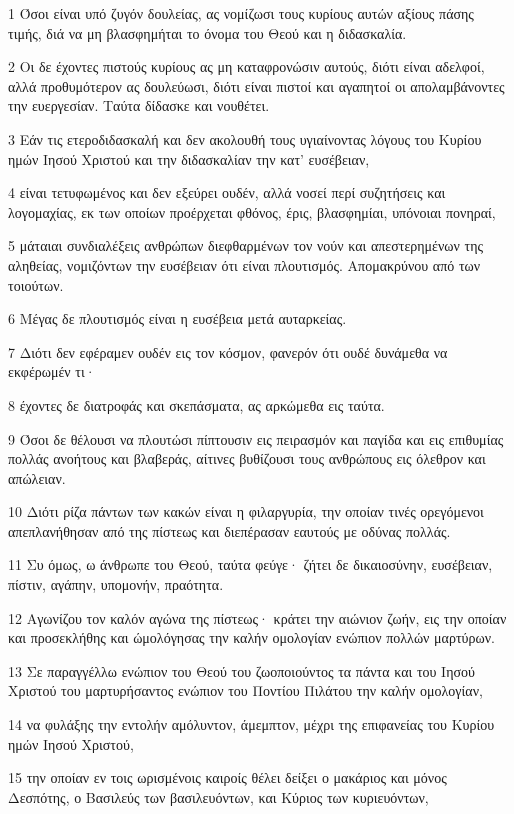 \par 1 Όσοι είναι υπό ζυγόν δουλείας, ας νομίζωσι τους κυρίους αυτών αξίους πάσης τιμής, διά να μη βλασφημήται το όνομα του Θεού και η διδασκαλία.
\par 2 Οι δε έχοντες πιστούς κυρίους ας μη καταφρονώσιν αυτούς, διότι είναι αδελφοί, αλλά προθυμότερον ας δουλεύωσι, διότι είναι πιστοί και αγαπητοί οι απολαμβάνοντες την ευεργεσίαν. Ταύτα δίδασκε και νουθέτει.
\par 3 Εάν τις ετεροδιδασκαλή και δεν ακολουθή τους υγιαίνοντας λόγους του Κυρίου ημών Ιησού Χριστού και την διδασκαλίαν την κατ' ευσέβειαν,
\par 4 είναι τετυφωμένος και δεν εξεύρει ουδέν, αλλά νοσεί περί συζητήσεις και λογομαχίας, εκ των οποίων προέρχεται φθόνος, έρις, βλασφημίαι, υπόνοιαι πονηραί,
\par 5 μάταιαι συνδιαλέξεις ανθρώπων διεφθαρμένων τον νούν και απεστερημένων της αληθείας, νομιζόντων την ευσέβειαν ότι είναι πλουτισμός. Απομακρύνου από των τοιούτων.
\par 6 Μέγας δε πλουτισμός είναι η ευσέβεια μετά αυταρκείας.
\par 7 Διότι δεν εφέραμεν ουδέν εις τον κόσμον, φανερόν ότι ουδέ δυνάμεθα να εκφέρωμέν τι·
\par 8 έχοντες δε διατροφάς και σκεπάσματα, ας αρκώμεθα εις ταύτα.
\par 9 Όσοι δε θέλουσι να πλουτώσι πίπτουσιν εις πειρασμόν και παγίδα και εις επιθυμίας πολλάς ανοήτους και βλαβεράς, αίτινες βυθίζουσι τους ανθρώπους εις όλεθρον και απώλειαν.
\par 10 Διότι ρίζα πάντων των κακών είναι η φιλαργυρία, την οποίαν τινές ορεγόμενοι απεπλανήθησαν από της πίστεως και διεπέρασαν εαυτούς με οδύνας πολλάς.
\par 11 Συ όμως, ω άνθρωπε του Θεού, ταύτα φεύγε· ζήτει δε δικαιοσύνην, ευσέβειαν, πίστιν, αγάπην, υπομονήν, πραότητα.
\par 12 Αγωνίζου τον καλόν αγώνα της πίστεως· κράτει την αιώνιον ζωήν, εις την οποίαν και προσεκλήθης και ώμολόγησας την καλήν ομολογίαν ενώπιον πολλών μαρτύρων.
\par 13 Σε παραγγέλλω ενώπιον του Θεού του ζωοποιούντος τα πάντα και του Ιησού Χριστού του μαρτυρήσαντος ενώπιον του Ποντίου Πιλάτου την καλήν ομολογίαν,
\par 14 να φυλάξης την εντολήν αμόλυντον, άμεμπτον, μέχρι της επιφανείας του Κυρίου ημών Ιησού Χριστού,
\par 15 την οποίαν εν τοις ωρισμένοις καιροίς θέλει δείξει ο μακάριος και μόνος Δεσπότης, ο Βασιλεύς των βασιλευόντων, και Κύριος των κυριευόντων,
